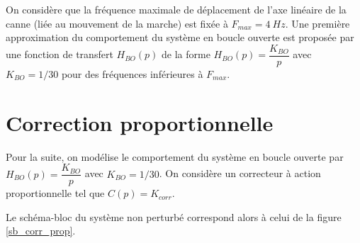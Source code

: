 

%
%

\medskip
On considère que la fréquence maximale de déplacement de l'axe linéaire de la canne (liée au mouvement de la marche) est fixée à $F_{max} =\SI{4}{Hz}$. Une première approximation du comportement du système en boucle ouverte est proposée par une fonction de transfert $H_{BO}(p)$ de la forme $H_{BO}(p) = \dfrac{K_{BO}}{p}$ avec $K_{BO} = 1/30$ pour des fréquences inférieures à $F_{max}$.
\medskip


\section{Correction proportionnelle}

Pour la suite, on modélise le comportement du système en boucle ouverte par $H_{BO}(p) = \dfrac{K_{BO}}{p}$ avec $K_{BO} = 1/30$. On considère un correcteur à action proportionnelle tel que $C(p)= K_{corr}$.

Le schéma-bloc du système non perturbé correspond alors à celui de la figure \ref{sb_corr_prop}.


\begin{center}
\end{center}

